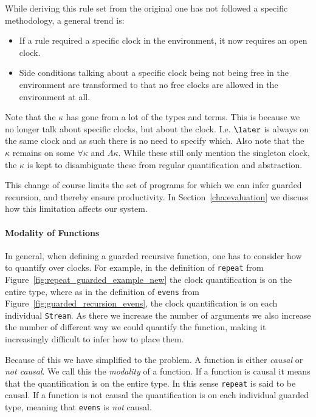 While deriving this rule set from the original one has not followed a specific
methodology, a general trend is:

\begin{itemize}
\item If a rule required a specific clock in the environment, it now requires an
  open clock.
\item Side conditions talking about a specific clock being not being free in the
  environment are transformed to that no free clocks are allowed in the
  environment at all.
\end{itemize}

Note that the $\kappa$ has gone from a lot of the types and terms. This is
because we no longer talk about specific clocks, but about the
clock. I.e. $\later$ is always on the same clock and as such there is no need to
specify which. Also note that the $\kappa$ remains on some $\forall \kappa$ and
$\Lambda \kappa$. While these still only mention the singleton clock, the
$\kappa$ is kept to disambiguate these from regular quantification and
abstraction. 

This change of course limits the set of programs for which we can infer guarded
recursion, and thereby ensure productivity. In Section~\ref{cha:evaluation} we
discuss how this limitation affects our system.

\paragraph{Modality of Functions}
In general, when defining a guarded recursive function, one has to consider how
to quantify over clocks. For example, in the definition of \texttt{repeat} from
Figure~\ref{fig:repeat_guarded_example_new} the clock quantification is on the
entire type, where as in the definition of \texttt{evens} from
Figure~\ref{fig:guarded_recursion_evens}, the clock quantification is on each
individual \texttt{Stream}. As there we increase the number of arguments we also
increase the number of different way we could quantify the function, making it
increasingly difficult to infer how to place them.

Because of this we have simplified to the problem. A function is either
\emph{causal} or \emph{not causal}. We call this the \emph{modality} of a
function. If a function is causal it means that the quantification is on the
entire type. In this sense \texttt{repeat} is said to be causal. If a function
is not causal the quantification is on each individual guarded type, meaning
that \texttt{evens} is \emph{not} causal.

